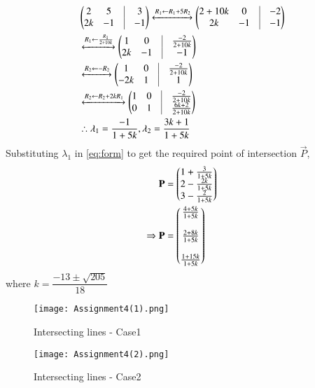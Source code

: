 \documentclass[journal,12pt,twocolumn]{IEEEtran}
\begin{document}
\begin{align}
    &\myvec{2 & 5 & \vrule & 3 \\
		2k & -1 & \vrule & -1 \\}\xleftrightarrow{R_1\leftarrow R_{1}+5R_{2}}
	\myvec{
		2+10k & 0 & \vrule & -2 \\
		2k & -1 & \vrule & -1 \\}\\
	&\xleftrightarrow{R_1\leftarrow \frac{R_{1}}{2+10k}}
	\myvec{
		1 & 0 & \vrule & \frac{-2}{2+10k} \\
		2k & -1 & \vrule & -1 \\
	}\\&\xleftrightarrow{R_2\leftarrow -R_{2}}
	\myvec{
		1 & 0 & \vrule & \frac{-2}{2+10k} \\
		-2k & 1 & \vrule & 1 \\
	}\\&\xleftrightarrow{R_2\leftarrow R_{2}+2kR_{1}}
	\myvec{
		1 & 0 & \vrule & \frac{-2}{2+10k} \\
		0 & 1 & \vrule & \frac{6k+2}{2+10k} \\
	}\\
	&\therefore \lambda_{1}=\frac{-1}{1+5k},\lambda_{2}=\frac{3k+1}{1+5k}
\end{align}
Substituting $\lambda_{1}$ in \eqref{eq:form} to get the required point of intersection $\vec{P}$,
\begin{align}
    \mathbf{P}&=\begin{pmatrix}1+\frac{3}{1+5k}\\
    2-\frac{2k}{1+5k}\\
    3-\frac{2}{1+5k}\end{pmatrix}\\
    \Rightarrow \mathbf{P}&=\begin{pmatrix}\frac{4+5k}{1+5k}\\\\
    \frac{2+8k}{1+5k}\\\\
    \frac{1+15k}{1+5k}\end{pmatrix}
\end{align}
where $k=\dfrac{-13\pm \sqrt{205}}{18}$

\begin{figure}[!h]
 \centering
 \texttt{[image: Assignment4(1).png]}
 \caption{Intersecting lines - Case1}
 \label{plot}
\end{figure}
\begin{figure}[!h]
 \centering
 \texttt{[image: Assignment4(2).png]}
 \caption{Intersecting lines - Case2}
 \label{plot}
\end{figure}
\end{document}
